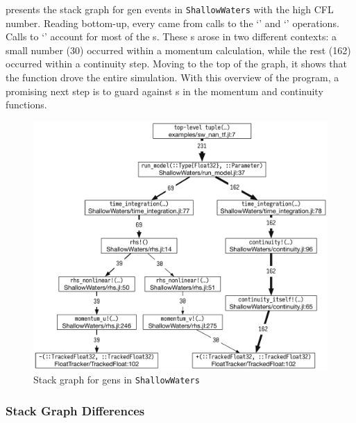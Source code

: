\documentclass{juliacon}
\begin{document}
 presents the stack graph for \NaN{} gen events
in \texttt{ShallowWaters} with the high CFL number.
Reading bottom-up, every \NaN{} came from calls to the `\code{-}' and `\code{+}' operations.
Calls to `\code{+}' account for most of the \NaN{}s.
These \NaN{}s arose in two different contexts: a small number (30)
occurred within a momentum calculation, while the rest (162)
occurred within a continuity step.
Moving to the top of the graph, it shows that the function  drove
the entire simulation.
With this overview of the program, a promising next step is to guard against \NaN{}s
in the momentum and continuity functions.

\begin{figure}[t]
  \centering
  \includegraphics[width=0.96\columnwidth]{fig/sw_nan_cstg_clean.pdf}
  \caption{Stack graph for \NaN{} gens in \texttt{ShallowWaters}}
  \label{fig:sw_nan_cstg}
\end{figure}



\subsubsection{Stack Graph Differences}
\end{document}
